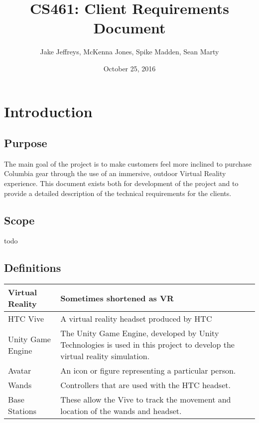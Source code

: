 \documentclass[10pt,journal,compsoc,onecolumn]{IEEEtran}
\title{CS461: Client Requirements Document}
\author{Jake Jeffreys, McKenna Jones, Spike Madden, Sean Marty}
\date{October 25, 2016}
\begin{document}
\begin{titlepage}
\maketitle
\vspace{3cm}

\end{titlepage}

\tableofcontents
\clearpage
\section{Introduction}

\subsection{Purpose}
The main goal of the project is to make customers feel more inclined to purchase
Columbia gear through the use of an immersive, outdoor Virtual Reality
experience. This document exists both for development of the project and to provide a detailed description of the technical requirements for the clients.

\subsection{Scope}
todo

\subsection{Definitions}
\begin{center}
	\begin{tabular}{| m{3cm} | m{9cm} |}
		\hline
		Virtual Reality & Sometimes shortened as VR \\
		\hline
		HTC Vive & A virtual reality headset produced by HTC \\
		\hline
		Unity Game Engine & The Unity Game Engine, developed by Unity
		Technologies is used in this project to develop the virtual reality simulation. \\
    	\hline
    	Avatar & An icon or figure representing a particular person. \\
    	\hline
    	Wands & Controllers that are used with the HTC headset. \\
    	\hline
		Base Stations & These allow the Vive to track the movement and location of the wands and headset. \\
		\hline
	\end{tabular}
\end{center}
\end{document}
